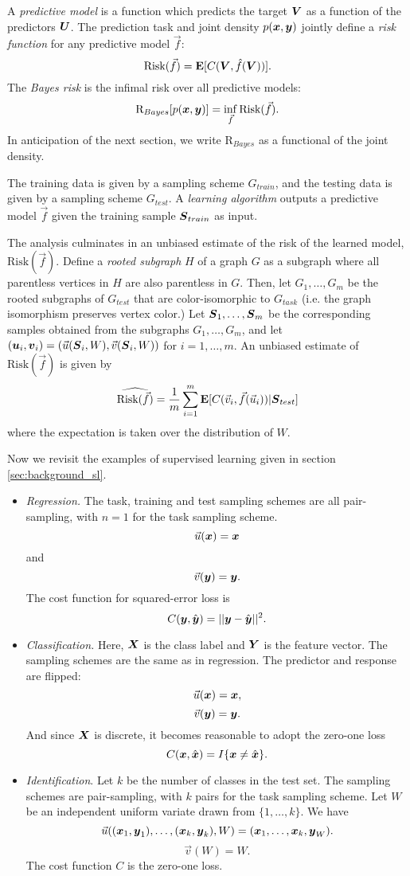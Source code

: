 \documentclass[12pt]{article}
\begin{document}
A \emph{predictive model} is a function which predicts the target
$\boldsymbol{V}$ as a function of the predictors $\boldsymbol{U}$.  The prediction task and
joint density $p(\boldsymbol{x},\boldsymbol{y})$ jointly define a \emph{risk function} for
any predictive model $\vec{f}$:
\[
\text{Risk}(\vec{f}) = \textbf{E}[C(\boldsymbol{V}, \hat{f}(\boldsymbol{V}))].
\]
The \emph{Bayes risk} is the infimal risk over all predictive models:
\[
\text{R}_{Bayes}[p(\boldsymbol{x},\boldsymbol{y})] = \inf_{\vec{f}} \text{Risk}(\vec{f}).
\]
In anticipation of the next section, we write $\text{R}_{Bayes}$ as a
functional of the joint density.

The training data is given by a sampling scheme $G_{train}$, and the
testing data is given by a sampling scheme $G_{test}$.
A \emph{learning algorithm} outputs a predictive model $\vec{f}$ given
the training sample $\boldsymbol{S}_{train}$ as input.

The analysis culminates in an unbiased estimate of the risk of the
learned model, $\text{Risk}(\vec{f})$.  Define a \emph{rooted
subgraph} $H$ of a graph $G$ as a subgraph where all parentless
vertices in $H$ are also parentless in $G$.  Then, let $G_1,\hdots,
G_m$ be the rooted subgraphs of $G_{test}$ that are color-isomorphic
to $G_{task}$ (i.e. the graph isomorphism preserves vertex color.)
Let $\boldsymbol{S}_1,\hdots, \boldsymbol{S}_m$ be the corresponding samples obtained from
the subgraphs $G_1,\hdots, G_m$, and let $(\boldsymbol{u}_i, \boldsymbol{v}_i) =
(\vec{u}(\boldsymbol{S}_i, W), \vec{v}(\boldsymbol{S}_i, W))$ for $i = 1,\hdots, m$.  An unbiased estimate of $\text{Risk}(\vec{f})$ is given by
\[
\widehat{\text{Risk}(\vec{f})} = \frac{1}{m}\sum_{i=1}^m \textbf{E}[C(\vec{v}_i, \vec{f}(\vec{u}_i))|\boldsymbol{S}_{test}]
\]
where the expectation is taken over the distribution of $W$.

Now we revisit the examples of supervised learning given in
section \ref{sec:background_sl}.
\begin{itemize}
\item \emph{Regression.}  
The task, training and test sampling schemes are all pair-sampling,
with $n= 1$ for the task sampling scheme.
\[
\vec{u}(\boldsymbol{x}) = \boldsymbol{x}
\]
and
\[
\vec{v}(\boldsymbol{y}) = \boldsymbol{y}.
\]
The cost function for squared-error loss is
\[
C(\boldsymbol{y}, \hat{\boldsymbol{y}}) = ||\boldsymbol{y} - \hat{\boldsymbol{y}}||^2.
\]
\item \emph{Classification.}  
Here, $\boldsymbol{X}$ is the class label and $\boldsymbol{Y}$ is the feature vector. The
sampling schemes are the same as in regression.  The predictor and
response are flipped:
\[
\vec{u}(\boldsymbol{x}) = \boldsymbol{x},
\]
\[
\vec{v}(\boldsymbol{y}) = \boldsymbol{y}.
\]
And since $\boldsymbol{X}$ is discrete, it becomes reasonable to adopt the zero-one loss
\[
C(\boldsymbol{x},  \hat{\boldsymbol{x}}) = I\{\boldsymbol{x} \neq \hat{\boldsymbol{x}}\}.
\]
\item \emph{Identification}.  
Let $k$ be the number of classes in the test set. The sampling schemes
are pair-sampling, with $k$ pairs for the task sampling scheme.  Let
$W$ be an independent uniform variate drawn from $\{1,\hdots, k\}$.
We have
\[
\vec{u}((\boldsymbol{x}_1,\boldsymbol{y}_1),\hdots, (\boldsymbol{x}_k, \boldsymbol{y}_k), W) = (\boldsymbol{x}_1,\hdots, \boldsymbol{x}_k, \boldsymbol{y}_W).
\]
\[
\vec{v}(W) = W.
\]
The cost function $C$ is the zero-one loss.
\end{itemize}
\end{document}
